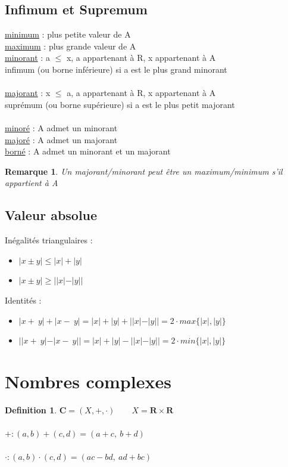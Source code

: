 \documentclass{article}
\newtheorem{definition}{Definition}[section]
\newtheorem{remark}{Remarque}[section]
\begin{document}
\subsection{Infimum et Supremum}
\underline{minimum} : plus petite valeur de A \\
\underline{maximum} : plus grande valeur de A \\
\underline{minorant} : a \(\leq\) x, a appartenant à R, x appartenant à A \\ infimum (ou borne inférieure) si a est le plus grand minorant \\\\
\underline{majorant} : x \(\leq\) a, a appartenant à R, x appartenant à A  \\ suprémum (ou borne supérieure) si a est le plus petit majorant\\\\
\underline{minoré} : A admet un minorant \\
\underline{majoré} : A admet un majorant \\
\underline{borné} : A admet un minorant et un majorant
\begin{remark}
    Un majorant/minorant peut être un maximum/minimum s'il appartient à A
\end{remark}
\subsection{Valeur absolue}
Inégalités triangulaires :
\begin{itemize}
    \item \( |x \pm y| \leq |x| + |y| \)
    \item \( |x \pm y| \geq ||x| - |y|| \)
\end{itemize}
Identités :
\begin{itemize}
    \item \( |x +\ y| + |x -\ y| =  |x| + |y| + ||x| - |y|| = 2 \cdot max\{|x|, |y|\}\)
    \item \( ||x +\ y| - |x -\ y|| =  |x| + |y| - ||x| - |y|| = 2 \cdot min\{|x|, |y|\}\)
\end{itemize}
\section{Nombres complexes}
\begin{definition}
   \( \mathbf{C} = (X, +, \cdot) \qquad X = \mathbf{R} \times \mathbf{R} \)\\\\
   \( + : (a, b) + (c, d) = (a + c,\ b + d)\) \\\\
   \( \cdot : (a, b) \cdot (c, d) = (ac - bd,\ ad + bc) \)
\end{definition} \newpage
\end{document}
